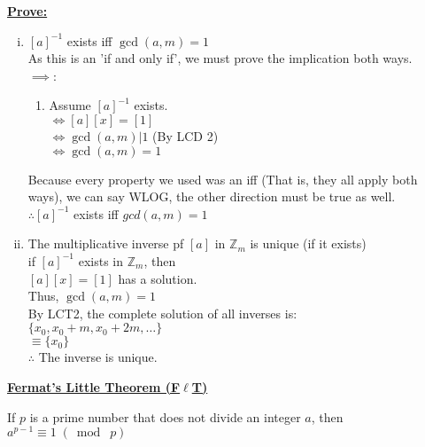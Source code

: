 \documentclass{letter}
\begin{document}
	\underline{\textbf{Prove:}}
	\begin{enumerate}[i)]
		\item $[a]^{-1}$ exists iff $\gcd(a, m) = 1$\\
		
		As this is an 'if and only if', we must prove the implication both ways.\\
		$\implies$: 
		\begin{enumerate}[ ]
			\item Assume $[a]^{-1}$ exists.\\
			$\iff [a][x] = [1]$\\
			$\iff \gcd(a, m) \vert 1$ (By LCD 2)\\
			$\iff \gcd(a, m) = 1$
		\end{enumerate}
		Because every property we used was an iff (That is, they all apply both ways), we can say WLOG, the other direction must be true as well.\\
		$\therefore [a]^{-1}$ exists iff $gcd(a, m) = 1$
		\item The multiplicative inverse pf $[a]$ in $\mathbb{Z}_m$ is unique (if it exists)\\
		
		if $[a]^{-1}$ exists in $\mathbb{Z}_m$, then\\
		$[a][x] = [1]$ has a solution.\\
		Thus, $\gcd(a, m) = 1$\\
		By LCT2, the complete solution of all inverses is:\\
		$\lbrace x_{0}, x_{0}+m, x_{0}+2m, \dots \rbrace$\\
		$\equiv \lbrace x_{0} \rbrace$\\
		$\therefore$ The inverse is unique.
	\end{enumerate}
	\pagebreak
	\underline{\textbf{Fermat's Little Theorem (F$\ell$T)}}
	
	If $p$ is a prime number that does not divide an integer $a$, then\\
	$a^{p-1} \equiv 1\;(\bmod\; p)$\\
	
\end{document}
